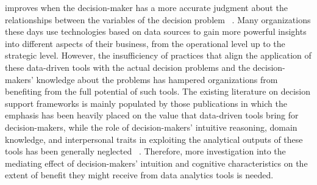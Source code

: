 \documentclass{sfuthesis}
\begin{document}
improves when the decision-maker has a more accurate judgment about the relationships between the variables of the decision problem ~\cite{janssen2017factors}. Many organizations these days use technologies based on data sources to gain more powerful insights into different aspects of their business, from the operational level up to the strategic level. However, the insufficiency of practices that align the application of these data-driven tools with the actual decision problems and the decision-makers' knowledge about the problems has hampered organizations from benefiting from the full potential of such tools. The existing literature on decision support frameworks is mainly populated by those publications in which the emphasis has been heavily placed on the value that data-driven tools bring for decision-makers, while the role of decision-makers’ intuitive reasoning, domain knowledge, and interpersonal traits in exploiting the analytical outputs of these tools has been generally neglected ~\cite{janssen2017factors}. Therefore, more investigation into the mediating effect of decision-makers’ intuition and cognitive characteristics on the extent of benefit they might receive from data analytics tools is needed.
\end{document}
